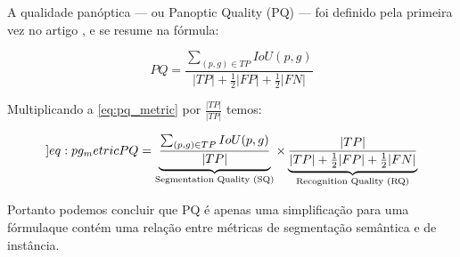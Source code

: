
A qualidade panóptica — ou Panoptic Quality (PQ) — foi definido pela primeira vez no artigo , e se resume na fórmula:

\begin{equation}
\label{eq:pq_metric}
PQ = \frac{\sum_{(p,g)\in TP}IoU(p,g)}{ |TP| + \frac{1}{2}|FP| + \frac{1}{2}|FN|}
\end{equation}

Multiplicando a \cref{eq:pq_metric} por $\frac{|TP|}{|TP|}$ temos:

\begin{equation}
	\label[]{eq:pg_metric}
	PQ = \underbrace{\frac{\sum_{(p,g)\in TP}IoU(p,g)}{|TP|}}_{\text{Segmentation Quality (SQ)}} 
	\times
	\underbrace{\frac{|TP|}{|TP| + \frac{1}{2}|FP| + \frac{1}{2}|FN|}}_{\text{Recognition Quality (RQ)}}
\end{equation}

Portanto podemos concluir que PQ é apenas uma simplificação para uma fórmulaque contém uma relação entre métricas de segmentação semântica e de instância.


